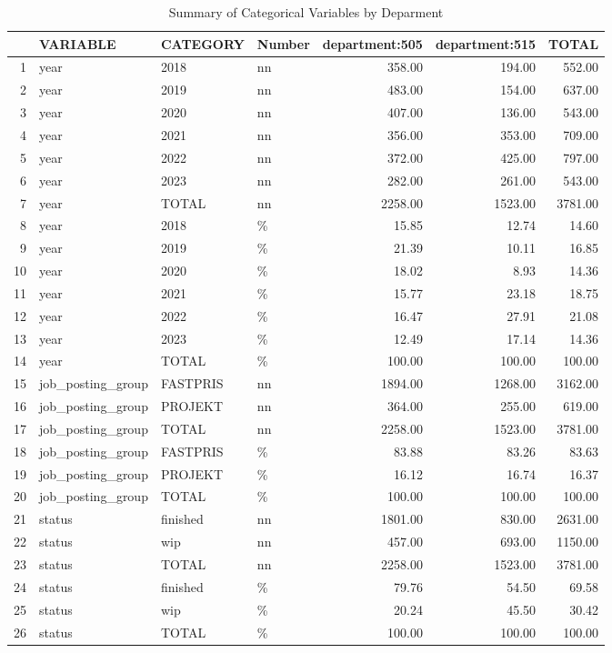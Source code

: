\begin{sidewaystable}[ht]
\centering
\caption{Summary of Categorical Variables by Deparment} 
\begin{tabular}{rlllrrr}
  \hline
 & VARIABLE & CATEGORY & Number & department:505 & department:515 & TOTAL \\ 
  \hline
1 & year & 2018 & nn & 358.00 & 194.00 & 552.00 \\ 
  2 & year & 2019 & nn & 483.00 & 154.00 & 637.00 \\ 
  3 & year & 2020 & nn & 407.00 & 136.00 & 543.00 \\ 
  4 & year & 2021 & nn & 356.00 & 353.00 & 709.00 \\ 
  5 & year & 2022 & nn & 372.00 & 425.00 & 797.00 \\ 
  6 & year & 2023 & nn & 282.00 & 261.00 & 543.00 \\ 
  7 & year & TOTAL & nn & 2258.00 & 1523.00 & 3781.00 \\ 
  8 & year & 2018 & \% & 15.85 & 12.74 & 14.60 \\ 
  9 & year & 2019 & \% & 21.39 & 10.11 & 16.85 \\ 
  10 & year & 2020 & \% & 18.02 & 8.93 & 14.36 \\ 
  11 & year & 2021 & \% & 15.77 & 23.18 & 18.75 \\ 
  12 & year & 2022 & \% & 16.47 & 27.91 & 21.08 \\ 
  13 & year & 2023 & \% & 12.49 & 17.14 & 14.36 \\ 
  14 & year & TOTAL & \% & 100.00 & 100.00 & 100.00 \\ 
  15 & job\_posting\_group & FASTPRIS & nn & 1894.00 & 1268.00 & 3162.00 \\ 
  16 & job\_posting\_group & PROJEKT & nn & 364.00 & 255.00 & 619.00 \\ 
  17 & job\_posting\_group & TOTAL & nn & 2258.00 & 1523.00 & 3781.00 \\ 
  18 & job\_posting\_group & FASTPRIS & \% & 83.88 & 83.26 & 83.63 \\ 
  19 & job\_posting\_group & PROJEKT & \% & 16.12 & 16.74 & 16.37 \\ 
  20 & job\_posting\_group & TOTAL & \% & 100.00 & 100.00 & 100.00 \\ 
  21 & status & finished & nn & 1801.00 & 830.00 & 2631.00 \\ 
  22 & status & wip & nn & 457.00 & 693.00 & 1150.00 \\ 
  23 & status & TOTAL & nn & 2258.00 & 1523.00 & 3781.00 \\ 
  24 & status & finished & \% & 79.76 & 54.50 & 69.58 \\ 
  25 & status & wip & \% & 20.24 & 45.50 & 30.42 \\ 
  26 & status & TOTAL & \% & 100.00 & 100.00 & 100.00 \\ 
   \hline
\end{tabular}
\end{sidewaystable}
